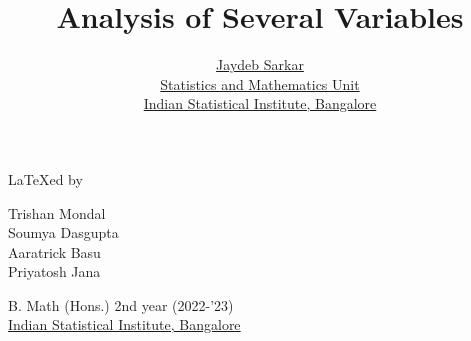 \documentclass{report}
\title{\Huge Analysis of Several Variables}
\author{{\LARGE \href{https://www.isibang.ac.in/~jay/}{Jaydeb Sarkar}} \\[0.5cm]
  \href{https://www.isibang.ac.in/~statmath}{Statistics and Mathematics Unit} \\
  \href{https://www.isibang.ac.in}{Indian Statistical Institute, Bangalore}}
\date{}
\begin{document}



\maketitle

{\vspace*{\fill}\centering
{\LARGE \LaTeX ed by}
\vspace{0.5cm}
\begin{center}
  \large
  Trishan Mondal \\
  Soumya Dasgupta \\
  Aaratrick Basu \\
  Priyatosh Jana
\end{center}
\vspace{0.5cm}
\begin{center}
  B. Math (Hons.) 2nd year (2022-'23) \\
  \href{https://www.isibang.ac.in}{Indian Statistical Institute, Bangalore}
\end{center}
\vspace*{\fill}}

\tableofcontents





% 














\end{document}
